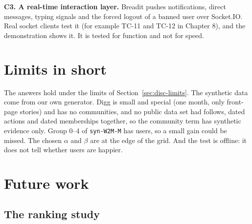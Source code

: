 \textbf{C3. A real-time interaction layer.} Breadit pushes notifications, direct messages, typing signals and the forced logout of a banned user over Socket.IO. Real socket clients test it (for example TC-11 and TC-12 in Chapter 8), and the demonstration shows it. It is tested for function and not for speed.

\section{Limits in short}
\label{sec:concl-limits}

The answers hold under the limits of Section~\ref{sec:disc-limits}. The synthetic data come from our own generator. Digg is small and special (one month, only front-page stories) and has no communities, and no public data set had follows, dated actions and dated memberships together, so the community term has synthetic evidence only. Group 0--4 of \texttt{syn-W2M-M} has \eTwoWTwoMNdcgTenZeroFourN{} users, so a small gain could be missed. The chosen $\alpha$ and $\beta$ are at the edge of the grid. And the test is offline: it does not tell whether users are happier.

\section{Future work}
\label{sec:concl-future}

\subsection{The ranking study}

